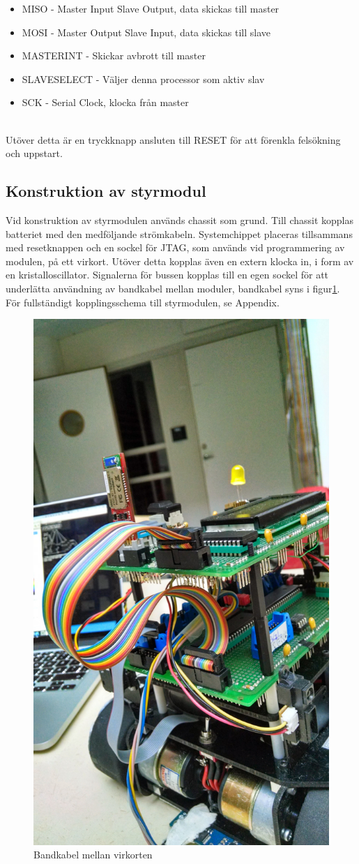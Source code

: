 \documentclass[a4paper,12pt,fleqn]{article}
\begin{document}
\begin{itemize}
	\item MISO - Master Input Slave Output, data skickas till master
	\item MOSI - Master Output Slave Input, data skickas till slave
	\item MASTERINT - Skickar avbrott till master
	\item SLAVESELECT - Väljer denna processor som aktiv slav
	\item SCK - Serial Clock, klocka från master
\end{itemize}
~\\
Utöver detta är en tryckknapp ansluten till RESET för att förenkla felsökning och uppstart. 

\newpage
\subsection{Konstruktion av styrmodul}

Vid konstruktion av styrmodulen används chassit som grund. Till chassit kopplas batteriet med den medföljande strömkabeln. Systemchippet placeras tillsammans med resetknappen och en sockel för JTAG, som används vid programmering av modulen, på ett virkort. Utöver detta kopplas även en extern klocka in, i form av en kristalloscillator. Signalerna för bussen kopplas till en egen sockel för att underlätta användning av bandkabel mellan moduler, bandkabel syns i figur\ref{fig:band}. För fullständigt kopplingsschema till styrmodulen, se Appendix. 

\begin{figure}[htp] %
  \begin{center}
  \includegraphics[keepaspectratio=true,width=0.5\linewidth]{bilder/robotbilder/Bandkabel.jpg}  %
  \end{center}
  \caption{Bandkabel mellan virkorten} %
  \label{fig:band}
\end{figure}
\end{document}
